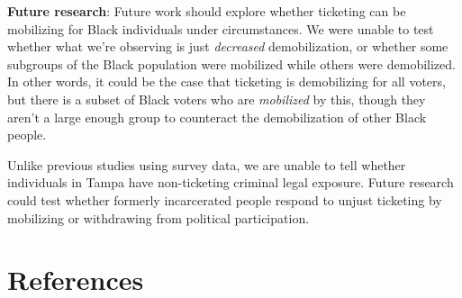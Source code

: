 \documentclass[
  12pt,
]{article}
\begin{document}
\textbf{Future research}: Future work should explore whether ticketing can be mobilizing for Black individuals under circumstances. We were unable to test whether what we're observing is just \emph{decreased} demobilization, or whether some subgroups of the Black population were mobilized while others were demobilized. In other words, it could be the case that ticketing is demobilizing for all voters, but there is a subset of Black voters who are \emph{mobilized} by this, though they aren't a large enough group to counteract the demobilization of other Black people.

Unlike previous studies using survey data, we are unable to tell whether individuals in Tampa have non-ticketing criminal legal exposure. Future research could test whether formerly incarcerated people respond to unjust ticketing by mobilizing or withdrawing from political participation.

\newpage

\hypertarget{references}{%
\section*{References}\label{references}}
\end{document}
